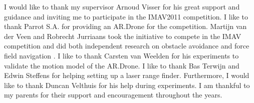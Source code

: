 I would like to thank my supervisor Arnoud Visser for his great support and guidance and inviting me to participate in the IMAV2011 competition.
I like to thank Parrot S.A. for providing an AR.Drone for the competition.
Martijn van der Veen and Robrecht Jurriaans took the initiative to compete in the IMAV competition and did both independent research on obstacle avoidance \cite{Jurriaans2011} and force field navigation \cite{VanDerVeen2011}.
I like to thank Carsten van Weelden for his experiments to validate the motion model of the AR.Drone. 
I like to thank Bas Terwijn and Edwin Steffens for helping setting up a laser range finder.
Furthermore, I would like to thank Duncan Velthuis for his help during experiments.
I am thankful to my parents for their support and encouragement throughout the years.
